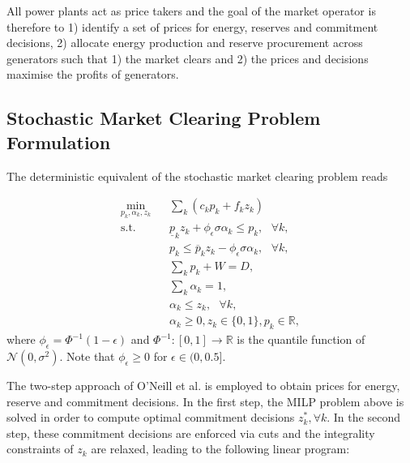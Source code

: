 \documentclass{article}
\begin{document}
All power plants act as price takers and the goal of the market operator is therefore to 1) identify a set of prices for energy, reserves and commitment decisions, 2) allocate energy production and reserve procurement across generators such that 1) the market clears and 2) the prices and decisions maximise the profits of generators. 

\subsection{Stochastic Market Clearing Problem Formulation}

The deterministic equivalent of the stochastic market clearing problem reads

\begin{align}
\underset{p_k, \alpha_k, z_k}{\min} \hspace{10pt} & \sum_k (c_k p_k + f_k z_k)\\
\mbox{s.t. } & \underline{p}_k z_k + \phi_{\epsilon} \sigma \alpha_k \le p_k, \mbox{ }\forall k,  \\
& p_k \le \overline{p}_k z_k - \phi_{\epsilon} \sigma \alpha_k, \mbox{ }\forall k,  \\
& \sum_k p_k + W = D,\\
& \sum_k \alpha_k = 1, \\
& \alpha_k \le z_k, \mbox{ }\forall k, \\
& \alpha_k \ge 0, z_k \in \{0, 1\}, p_k \in \mathbb{R},
\end{align}
where $\phi_{\epsilon} = \Phi^{-1}(1 - \epsilon)$ and $\Phi^{-1}:[0, 1] \rightarrow \mathbb{R}$ is the quantile function of $\mathcal{N}(0, \sigma^2)$. Note that $\phi_\epsilon \ge 0$ for $\epsilon \in (0, 0.5]$.

The two-step approach of O'Neill et al. \cite{ONeill2005} is employed to obtain prices for energy, reserve and commitment decisions. In the first step, the MILP problem above is solved in order to compute optimal commitment decisions $z_k^*, \forall k$. In the second step, these commitment decisions are enforced via cuts and the integrality constraints of $z_k$ are relaxed, leading to the following linear program:
\end{document}
